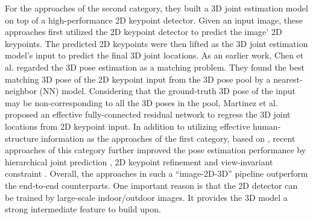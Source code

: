 \documentclass[journal]{IEEEtran}
\begin{document}
For the approaches of the second category, they built a 3D joint estimation model on top of a high-performance 2D keypoint detector. Given an input image, these approaches first utilized the 2D keypoint detector to predict the image' 2D keypoints. The predicted 2D keypoints were then lifted as the 3D joint estimation model's input to predict the final 3D joint locations. As an earlier work, Chen et al. \cite{chen20173d} regarded the 3D pose estimation as a matching problem. They found the best matching 3D pose of the 2D keypoint input from the 3D pose pool by a nearest-neighbor (NN) model. Considering that the ground-truth 3D pose of the input may be non-corresponding to all the 3D poses in the pool, Martinez et al. \cite{martinez2017simple} proposed an effective fully-connected residual network to regress the 3D joint locations from 2D keypoint input. In addition to utilizing effective human-structure information as the approaches of the first category, based on \cite{martinez2017simple}, recent approaches of this category further improved the pose estimation performance by hierarchical joint prediction \cite{lee2018propagating}, 2D keypoint refinement \cite{xu2020deep} and view-invariant constraint \cite{chen2019weakly,8763991}. Overall, the approaches in such a ``image-2D-3D'' pipeline outperform the end-to-end counterparts. One important reason is that the 2D detector can be trained by large-scale indoor/outdoor images. It provides the 3D model a strong intermediate feature to build upon.
\end{document}
